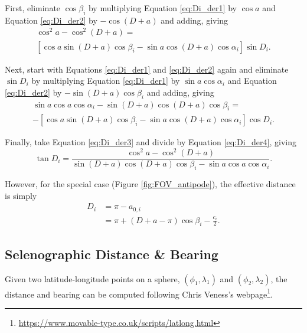 \documentclass{article}
\begin{document}
First, eliminate $\cos\beta_i$ by multiplying Equation \eqref{eq:Di_der1} by $\cos a$ and Equation \eqref{eq:Di_der2} by $-\cos(D+a)$ and adding, giving
\begin{align}\label{eq:Di_der3}
\cos^2a - \cos^2(D+a) = \\\nonumber
\left[\cos a\sin(D+a)\cos\beta_i - \sin a\cos(D+a)\cos\alpha_i\right]\sin D_i.
\end{align}

Next, start with Equations \eqref{eq:Di_der1} and \eqref{eq:Di_der2} again and eliminate $\sin D_i$ by multiplying Equation \eqref{eq:Di_der1} by $\sin a\cos\alpha_i$ and Equation \eqref{eq:Di_der2} by $-\sin(D+a)\cos\beta_i$ and adding, giving
\begin{align}\label{eq:Di_der4}
\sin a\cos a\cos\alpha_i - \sin(D+a)\cos(D+a)\cos\beta_i =\\\nonumber
-\left[\cos a\sin(D+a)\cos\beta_i - \sin a\cos(D+a)\cos\alpha_i\right]\cos D_i.
\end{align}

Finally, take Equation \eqref{eq:Di_der3} and divide by Equation \eqref{eq:Di_der4}, giving
\begin{equation}
\tan D_i = \frac{\cos^2a - \cos^2(D+a)}{\sin(D+a)\cos(D+a)\cos\beta_i - \sin a\cos a\cos\alpha_i}.
\end{equation}

However, for the special case (Figure \ref{fig:FOV_antipode}), the effective distance is simply
\begin{align}
D_i &= \pi - a_{0,i}\nonumber\\
&= \pi +(D+a-\pi)\cos\beta_i - \frac{c_i}{2}.
\end{align}



\clearpage




\subsection{Selenographic Distance \& Bearing}\label{ssec:Selenographic Distance/Bearing}


Given two latitude-longitude points on a sphere, $(\phi_1, \lambda_1)$ and $(\phi_2, \lambda_2)$, the distance and bearing can be computed following Chris Veness's webpage\footnote{\url{https://www.movable-type.co.uk/scripts/latlong.html}}.
\end{document}
